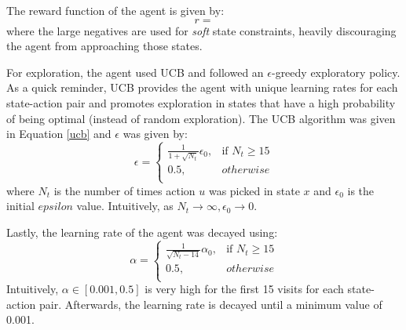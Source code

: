 The reward function of the agent is given by:
\begin{equation}
    r = 
    \label{eq:04WWTP_reward}
\end{equation}
where the large negatives are used for \textit{soft} state constraints, heavily discouraging the agent from approaching those states. 

For exploration, the agent used UCB and followed an $\epsilon$-greedy exploratory policy. As a quick reminder, UCB provides the agent with unique learning rates for each state-action pair and promotes exploration in states that have a high probability of being optimal (instead of random exploration). The UCB algorithm was given in Equation \ref{ucb} and $\epsilon$ was given by:
\[
    \epsilon =
\begin{cases}
    \frac{1}{1 + \sqrt{N_t}}\epsilon_0,              & \text{if } N_t  \geq 15 \\
    0.5,              & otherwise \\
\end{cases}
\]
where $N_t$ is the number of times action $u$ was picked in state $x$ and $\epsilon_0$ is the initial $epsilon$ value.  Intuitively, as $N_t \rightarrow \infty, \epsilon_0 \rightarrow 0$.

Lastly, the learning rate of the agent was decayed using:
\[
    \alpha =
\begin{cases}
    \frac{1}{\sqrt{N_t - 14}}\alpha_0,              & \text{if } N_t  \geq 15 \\
    0.5,              & otherwise \\
\end{cases}
\]
Intuitively, $\alpha \in [0.001, 0.5]$ is very high for the first 15 visits for each state-action pair.  Afterwards, the learning rate is decayed until a minimum value of 0.001.

